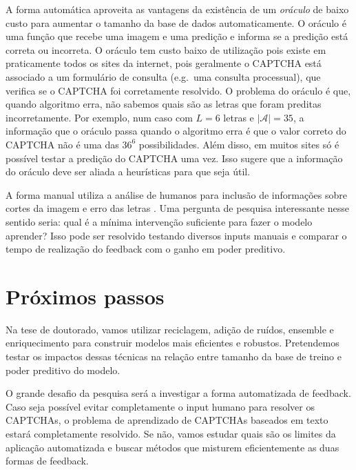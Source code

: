 \documentclass[12pt,]{report}
\begin{document}
A forma automática aproveita as vantagens da existência de um \emph{oráculo} de baixo custo para aumentar o tamanho da base de dados automaticamente. O oráculo é uma função que recebe uma imagem e uma predição e informa se a predição está correta ou incorreta. O oráculo tem custo baixo de utilização pois existe em praticamente todos os sites da internet, pois geralmente o CAPTCHA está associado a um formulário de consulta (e.g.~uma consulta processual), que verifica se o CAPTCHA foi corretamente resolvido. O problema do oráculo é que, quando algoritmo erra, não sabemos quais são as letras que foram preditas incorretamente. Por exemplo, num caso com \(L=6\) letras e \(|\mathcal A|=35\), a informação que o oráculo passa quando o algoritmo erra é que o valor correto do CAPTCHA não é uma das \(36^6\) possibilidades. Além disso, em muitos sites só é possível testar a predição do CAPTCHA uma vez. Isso sugere que a informação do oráculo deve ser aliada a heurísticas para que seja útil.

A forma manual utiliza a análise de humanos para inclusão de informações sobre cortes da imagem e erro das letras \citep{bursztein2014end}. Uma pergunta de pesquisa interessante nesse sentido seria: qual é a mínima intervenção suficiente para fazer o modelo aprender? Isso pode ser resolvido testando diversos inputs manuais e comparar o tempo de realização do feedback com o ganho em poder preditivo.

\hypertarget{pruxf3ximos-passos}{%
\section{Próximos passos}\label{pruxf3ximos-passos}}

Na tese de doutorado, vamos utilizar reciclagem, adição de ruídos, ensemble e enriquecimento para construir modelos mais eficientes e robustos. Pretendemos testar os impactos dessas técnicas na relação entre tamanho da base de treino e poder preditivo do modelo.

O grande desafio da pesquisa será a investigar a forma automatizada de feedback. Caso seja possível evitar completamente o input humano para resolver os CAPTCHAs, o problema de aprendizado de CAPTCHAs baseados em texto estará completamente resolvido. Se não, vamos estudar quais são os limites da aplicação automatizada e buscar métodos que misturem eficientemente as duas formas de feedback.

\clearpage

\hypertarget{appendix-apuxeandice}{%
\appendix {}}
\end{document}
